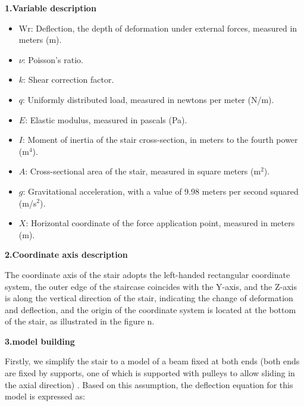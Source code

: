 \documentclass{mcmthesis}
\begin{document}
\textbf{1.Variable description}
\begin{itemize}[label=]  

\item \( \text{Wr} \): Deflection, the depth of deformation under external forces, measured in meters (m). 

\item \( \nu \): Poisson's ratio. 

\item \( k \): Shear correction factor. 

\item \( q \): Uniformly distributed load, measured in newtons per meter (N/m). 

\item \( E \): Elastic modulus, measured in pascals (Pa). 

\item \( I \): Moment of inertia of the stair cross-section, in meters to the fourth power (m\(^4\)). 

\item \( A \): Cross-sectional area of the stair, measured in square meters (m\(^2\)). 

\item \( g \): Gravitational acceleration, with a value of 9.98 meters per second squared (m/s\(^2\)). 

\item \( X \): Horizontal coordinate of the force application point, measured in meters (m). 



 \end{itemize}

\textbf{2.Coordinate axis description}

The coordinate axis of the stair adopts the left-handed rectangular coordinate system, the outer edge of the staircase coincides with the Y-axis, and the Z-axis is along the vertical direction of the stair, indicating the change of deformation and deflection, and the origin of the coordinate system is located at the bottom of the stair, as illustrated in the figure n.

\textbf{3.model building}

Firstly, we simplify the stair to a model of a beam fixed at both ends (both ends are fixed by supports, one of which is supported with pulleys to allow sliding in the axial direction) \cite{Levinson1981}\cite{SJZT20241216003}. Based on this assumption, the deflection equation for this model is expressed as:
\end{document}
